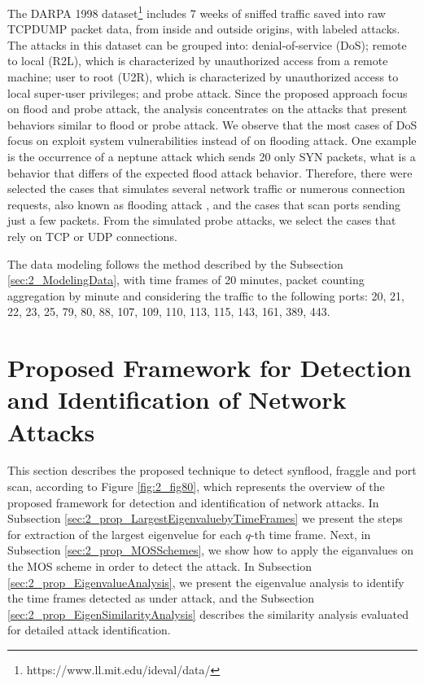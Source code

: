 The DARPA 1998 dataset\footnote{https://www.ll.mit.edu/ideval/data/} includes 7 weeks of sniffed traffic saved into raw TCPDUMP packet data, from inside and outside origins, with labeled attacks. The attacks in this dataset
can be grouped into: denial-of-service (DoS); remote to local (R2L), which is characterized by unauthorized access from a
remote machine; user to root (U2R), which is characterized by unauthorized access to local
super-user privileges; and probe attack. Since the proposed approach focus on flood and probe attack, the analysis concentrates on the attacks that present behaviors similar to flood or probe attack. We observe that the most cases of DoS focus on exploit system vulnerabilities instead of on flooding attack. One example is the occurrence of a neptune attack which sends 20 only SYN packets, what is a behavior that differs of the expected flood attack behavior. Therefore, there were selected the cases that simulates several network traffic or numerous connection requests, also known as flooding attack \cite{ahmed2016survey,osanaiye2016distributed}, and the cases that scan ports sending just a few packets. From the simulated probe attacks, we select the cases that rely on TCP or UDP connections.

The data modeling follows the method described by the Subsection \ref{sec:2_ModelingData}, with time frames of 20 minutes, packet counting aggregation by minute and considering the traffic to the following ports: 20, 21, 22, 23, 25, 79, 80, 88, 107, 109, 110, 113, 115, 143, 161, 389, 443.


\section{Proposed Framework for Detection and Identification of Network Attacks}
\label{sec:2_prop_getv}

This section describes the proposed technique to detect synflood, fraggle and port scan, according to Figure \ref{fig:2_fig80}, which represents the overview of the proposed framework for detection and identification of network attacks. In Subsection \ref{sec:2_prop_LargestEigenvaluebyTimeFrames} we present the steps for extraction of the largest eigenvelue for each $q$-th time frame. Next, in Subsection \ref{sec:2_prop_MOSSchemes}, we show how to apply the eiganvalues on the MOS scheme in order to detect the attack. In Subsection \ref{sec:2_prop_EigenvalueAnalysis}, we present the eigenvalue analysis to identify the time frames detected as under attack, and the Subsection \ref{sec:2_prop_EigenSimilarityAnalysis} describes the similarity analysis evaluated for detailed attack identification.

